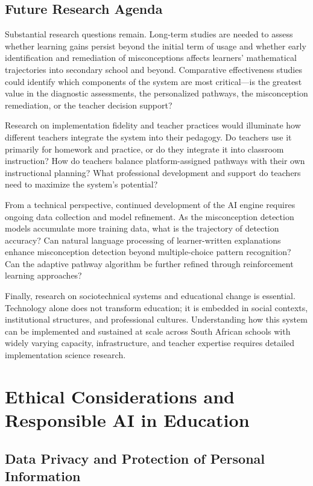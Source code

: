 \documentclass[12pt,a4paper]{article}
\begin{document}
\subsection{Future Research Agenda}

Substantial research questions remain. Long-term studies are needed to assess whether learning gains persist beyond the initial term of usage and whether early identification and remediation of misconceptions affects learners' mathematical trajectories into secondary school and beyond. Comparative effectiveness studies could identify which components of the system are most critical---is the greatest value in the diagnostic assessments, the personalized pathways, the misconception remediation, or the teacher decision support?

Research on implementation fidelity and teacher practices would illuminate how different teachers integrate the system into their pedagogy. Do teachers use it primarily for homework and practice, or do they integrate it into classroom instruction? How do teachers balance platform-assigned pathways with their own instructional planning? What professional development and support do teachers need to maximize the system's potential?

From a technical perspective, continued development of the AI engine requires ongoing data collection and model refinement. As the misconception detection models accumulate more training data, what is the trajectory of detection accuracy? Can natural language processing of learner-written explanations enhance misconception detection beyond multiple-choice pattern recognition? Can the adaptive pathway algorithm be further refined through reinforcement learning approaches?

Finally, research on sociotechnical systems and educational change is essential. Technology alone does not transform education; it is embedded in social contexts, institutional structures, and professional cultures. Understanding how this system can be implemented and sustained at scale across South African schools with widely varying capacity, infrastructure, and teacher expertise requires detailed implementation science research.

\section{Ethical Considerations and Responsible AI in Education}

\subsection{Data Privacy and Protection of Personal Information}
\end{document}
